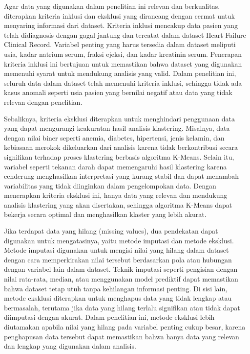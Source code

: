 \documentclass[english,12pt,a4paper,openany]{book}
\begin{document}
	Agar data yang digunakan dalam penelitian ini relevan dan berkualitas, diterapkan kriteria inklusi dan eksklusi yang dirancang dengan cermat untuk menyaring informasi dari dataset. Kriteria inklusi mencakup data pasien yang telah didiagnosis dengan gagal jantung dan tercatat dalam dataset Heart Failure Clinical Record. Variabel penting yang harus tersedia dalam dataset meliputi usia, kadar natrium serum, fraksi ejeksi, dan kadar kreatinin serum. Penerapan kriteria inklusi ini bertujuan untuk memastikan bahwa dataset yang digunakan memenuhi syarat untuk mendukung analisis yang valid. Dalam penelitian ini, seluruh data dalam dataset telah memenuhi kriteria inklusi, sehingga tidak ada kasus anomali seperti usia pasien yang bernilai negatif atau data yang tidak relevan dengan penelitian.
	
	Sebaliknya, kriteria eksklusi diterapkan untuk menghindari penggunaan data yang dapat mengurangi keakuratan hasil analisis klastering. Misalnya, data dengan nilai biner seperti anemia, diabetes, hipertensi, jenis kelamin, dan kebiasaan merokok dikeluarkan dari analisis karena tidak berkontribusi secara signifikan terhadap proses klastering berbasis algoritma K-Means. Selain itu, variabel seperti tekanan darah dapat memengaruhi hasil klastering karena cenderung menghasilkan interpretasi yang kurang stabil dan dapat menambah variabilitas yang tidak diinginkan dalam pengelompokan data. Dengan menerapkan kriteria eksklusi ini, hanya data yang relevan dan mendukung analisis klastering yang akan disertakan, sehingga algoritma K-Means dapat bekerja secara optimal dan menghasilkan klaster yang lebih akurat.
	
	Jika terdapat data yang hilang (missing values), dua pendekatan dapat digunakan untuk mengatasinya, yaitu metode imputasi dan metode eksklusi. Metode imputasi digunakan untuk mengisi nilai yang hilang dalam dataset dengan cara memperkirakan nilai tersebut berdasarkan pola atau hubungan dengan variabel lain dalam dataset. Teknik imputasi seperti pengisian dengan nilai rata-rata, median, atau menggunakan model prediktif dapat memastikan bahwa dataset tetap utuh tanpa kehilangan informasi penting. Di sisi lain, metode eksklusi diterapkan untuk menghapus data yang tidak lengkap atau bermasalah, terutama jika data yang hilang terlalu signifikan atau tidak dapat diimputasi dengan akurat. Dalam penelitian ini, metode eksklusi lebih diutamakan apabila nilai yang hilang pada variabel penting cukup besar, karena penghapusan data tersebut dapat memastikan bahwa hanya data yang relevan dan lengkap yang digunakan dalam analisis.
	
\end{document}
